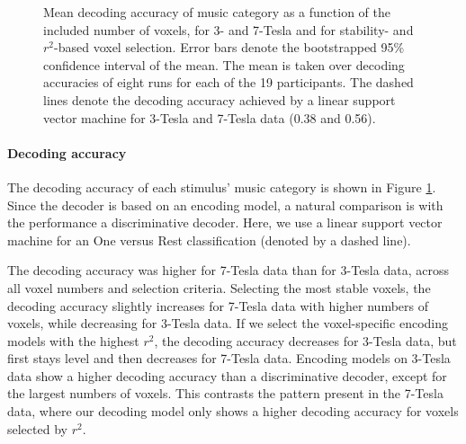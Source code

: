 \begin{figure}
  \centering
  \def\svgwidth{\linewidth}
  

  \caption{Mean decoding accuracy of music category as a function of the included number of
  voxels, for 3- and 7-Tesla and for stability- and $r^2$-based voxel selection. Error bars denote the bootstrapped 95\% confidence
  interval of the mean. The mean is taken over decoding accuracies of
  eight runs for each of the 19 participants. The dashed lines denote the
  decoding accuracy achieved by a linear support vector machine for 3-Tesla
  and 7-Tesla data (0.38 and 0.56).}

 \label{fig:decoding_accuracy}
\end{figure}

\paragraph{Decoding accuracy}

The decoding accuracy of each stimulus' music category is shown in Figure
\ref{fig:decoding_accuracy}. Since the decoder is based on an encoding model, a
natural comparison is with the performance a discriminative decoder. Here, we
use a linear support vector machine for an One versus Rest classification
(denoted by a dashed line).

The decoding accuracy was higher for 7-Tesla data
than for 3-Tesla data, across all voxel numbers and selection criteria.
Selecting the most stable voxels, the decoding accuracy slightly increases for
7-Tesla data with higher numbers of voxels, while decreasing for 3-Tesla data.
If we select the voxel-specific encoding models with the highest $r^2$, the
decoding accuracy decreases for 3-Tesla data, but first stays level and then
decreases for 7-Tesla data. Encoding models on 3-Tesla data show a higher
decoding accuracy than a discriminative decoder, except for the largest numbers
of voxels. This contrasts the pattern present in the 7-Tesla data, where our decoding model only
shows a higher decoding accuracy for voxels selected by $r^2$.

